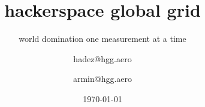 




\usepackage{url}
%

\usepackage{listings}
  
\usepackage[utf8]{inputenc}
\usepackage[T1]{fontenc}
\usepackage{lmodern}
\usepackage[ngerman]{babel}

\usepackage{amsmath}

\usepackage{array}
\usepackage{longtable}
\usepackage{graphicx}
\graphicspath{{./pic/}}

\newcommand{\shack}{\includegraphics<.->[height=1em]{shack_brightbg}}
\newcommand{\hgg}{\includegraphics<.->[height=1em]{hgg_logo_rgb_pos}}


\date{\today}

 
\title{hackerspace global grid} 
\subtitle{world domination one measurement at a time}
\author[hdz, reloc0]{hadez@hgg.aero \and armin@hgg.aero}

\subject{Vortragsreihe des CCCS}

\titlegraphic{}


\AtBeginSection
{
  \begin{frame}
  \end{frame}
}

\AtBeginSubsection
{
  \begin{frame}
  \end{frame}
}






